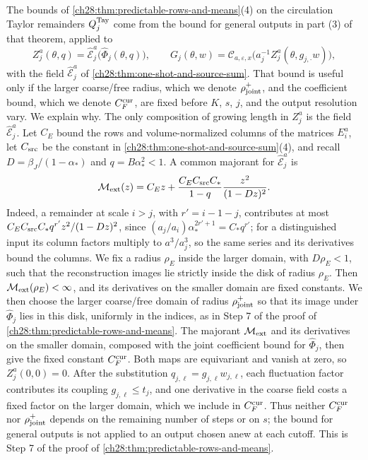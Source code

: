 \begin{remark}\label{ch29:rem:fixed-current-output}
The bounds of \cref{ch28:thm:predictable-rows-and-means}(4) on the circulation Taylor remainders $Q_j^{\rm Tay}$ come from the bound for general outputs in part (3) of that theorem, applied to
\[
 Z_j^a(\theta,q)=\widehat{\mathcal E}_j^a\bigl(\widehat\Phi_j(\theta,q)\bigr),\qquad G_j(\theta,w)=\mathscr C_{a,\varepsilon,x}\bigl(a_j^{-1}Z_j^a(\theta,g_{j,\cdot}w)\bigr),
\]
with the field $\widehat{\mathcal E}_j^a$ of \cref{ch28:thm:one-shot-and-source-sum}. That bound is useful only if the larger coarse/free radius, which we denote $\rho_{\rm joint}^+$, and the coefficient bound, which we denote $C_F^{\rm cur}$, are fixed before $K$, $s$, $j$, and the output resolution vary. We explain why. The only composition of growing length in $Z_j^a$ is the field $\widehat{\mathcal E}_j^a$. Let $C_E$ bound the rows and volume-normalized columns of the matrices $E_i^a$, let $C_{\rm src}$ be the constant in \cref{ch28:thm:one-shot-and-source-sum}(4), and recall $D=\beta_J/(1-\alpha_*)$ and $q=B\alpha_*^2<1$. A common majorant for $\widehat{\mathcal E}_j^a$ is
\begin{equation}\label{ch29:eq:fixed-extension-ceiling}
 \mathcal M_{\rm ext}(z)=C_Ez+\frac{C_EC_{\rm src}C_*}{1-q}\frac{z^2}{(1-Dz)^2}.
\end{equation}
Indeed, a remainder at scale $i>j$, with $r'=i-1-j$, contributes at most $C_EC_{\rm src}C_*q^{r'}z^2/(1-Dz)^2$, since $(a_j/a_i)\alpha_*^{2r'+1}=C_*q^{r'}$; for a distinguished input its column factors multiply to $a^3/a_j^3$, so the same series and its derivatives bound the columns. We fix a radius $\rho_E$ inside the larger domain, with $D\rho_E<1$, such that the reconstruction images lie strictly inside the disk of radius $\rho_E$. Then $\mathcal M_{\rm ext}(\rho_E)<\infty$, and its derivatives on the smaller domain are fixed constants. We then choose the larger coarse/free domain of radius $\rho_{\rm joint}^+$ so that its image under $\widehat\Phi_j$ lies in this disk, uniformly in the indices, as in Step 7 of the proof of \cref{ch28:thm:predictable-rows-and-means}. The majorant $\mathcal M_{\rm ext}$ and its derivatives on the smaller domain, composed with the joint coefficient bound for $\widehat\Phi_j$, then give the fixed constant $C_F^{\rm cur}$. Both maps are equivariant and vanish at zero, so $Z_j^a(0,0)=0$. After the substitution $q_{j,\ell}=g_{j,\ell}w_{j,\ell}$, each fluctuation factor contributes its coupling $g_{j,\ell}\le t_j$, and one derivative in the coarse field costs a fixed factor on the larger domain, which we include in $C_F^{\rm cur}$. Thus neither $C_F^{\rm cur}$ nor $\rho_{\rm joint}^+$ depends on the remaining number of steps or on $s$; the bound for general outputs is not applied to an output chosen anew at each cutoff. This is Step 7 of the proof of \cref{ch28:thm:predictable-rows-and-means}.
\end{remark}

